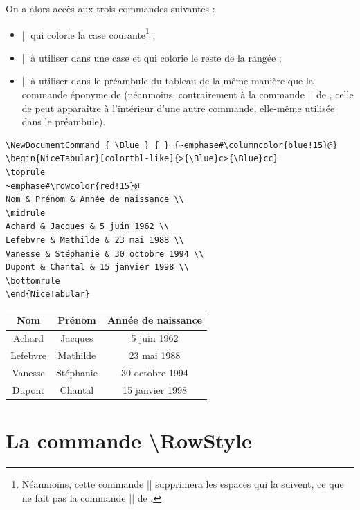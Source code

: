 \documentclass[dvipsnames]{article}%
\begin{document}
On a alors accès aux trois commandes suivantes :
\begin{itemize}
\item |\cellcolor| qui colorie la case courante\footnote{Néanmoins, cette
  commande |\cellcolor| supprimera les espaces qui la suivent, ce que ne fait
  pas la commande |\cellcolor| de .} ;
\item |\rowcolor| à utiliser dans une case et qui colorie le reste de la rangée
;
\item |\columncolor| à utiliser dans le préambule du tableau de la même manière
que la commande éponyme de  (néanmoins, contrairement à la
commande |\columncolor| de , celle de  peut
apparaître à l'intérieur d'une autre commande, elle-même utilisée dans le
préambule).
\end{itemize}

\medskip
\begin{Verbatim}
\NewDocumentCommand { \Blue } { } {~emphase#\columncolor{blue!15}@}
\begin{NiceTabular}[colortbl-like]{>{\Blue}c>{\Blue}cc}
\toprule
~emphase#\rowcolor{red!15}@
Nom & Prénom & Année de naissance \\
\midrule
Achard & Jacques & 5 juin 1962 \\
Lefebvre & Mathilde & 23 mai 1988 \\
Vanesse & Stéphanie & 30 octobre 1994 \\
Dupont & Chantal & 15 janvier 1998 \\
\bottomrule
\end{NiceTabular}
\end{Verbatim}


\begin{center}
\NewDocumentCommand { \Blue } { } {}
\begin{NiceTabular}{>{\Blue}c>{\Blue}cc}
\toprule
{}
Nom & Prénom & Année de naissance \\
\midrule
Achard & Jacques & 5 juin 1962 \\
Lefebvre & Mathilde & 23 mai 1988 \\
Vanesse & Stéphanie & 30 octobre 1994 \\
Dupont & Chantal & 15 janvier 1998 \\
\bottomrule
\end{NiceTabular}
\end{center}

\section{La commande \textbackslash RowStyle}
\end{document}
